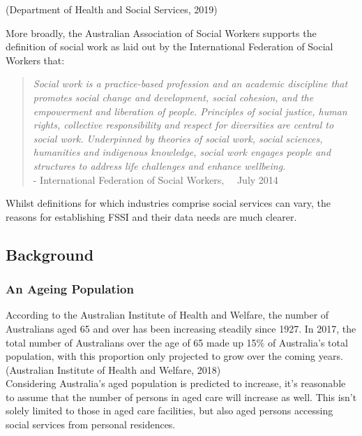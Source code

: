 \documentclass[
  11pt,
]{article}
\begin{document}
(Department of Health and Social Services, 2019)

\newpage

More broadly, the Australian Association of Social Workers supports the definition of social work as laid out by the International Federation of Social Workers that:

\begin{quote}
\emph{Social work is a practice-based profession and an academic discipline that promotes social change and development, social cohesion, and the empowerment and liberation of people. Principles of social justice, human rights, collective responsibility and respect for diversities are central to social work. Underpinned by theories of social work, social sciences, humanities and indigenous knowledge, social work engages people and structures to address life challenges and enhance wellbeing.}\\
\quad - International Federation of Social Workers, \newline \quad \quad ~~July 2014
\end{quote}

Whilst definitions for which industries comprise social services can vary, the reasons for establishing FSSI and their data needs are much clearer.

\hypertarget{background}{%
\subsection{Background}\label{background}}

\hypertarget{an-ageing-population}{%
\subsubsection{An Ageing Population}\label{an-ageing-population}}

According to the Australian Institute of Health and Welfare, the number of Australians aged 65 and over has been increasing steadily since 1927. In 2017, the total number of Australians over the age of 65 made up 15\% of Australia's total population, with this proportion only projected to grow over the coming years. (Australian Institute of Health and Welfare, 2018)\\
Considering Australia's aged population is predicted to increase, it's reasonable to assume that the number of persons in aged care will increase as well. This isn't solely limited to those in aged care facilities, but also aged persons accessing social services from personal residences.
\end{document}
